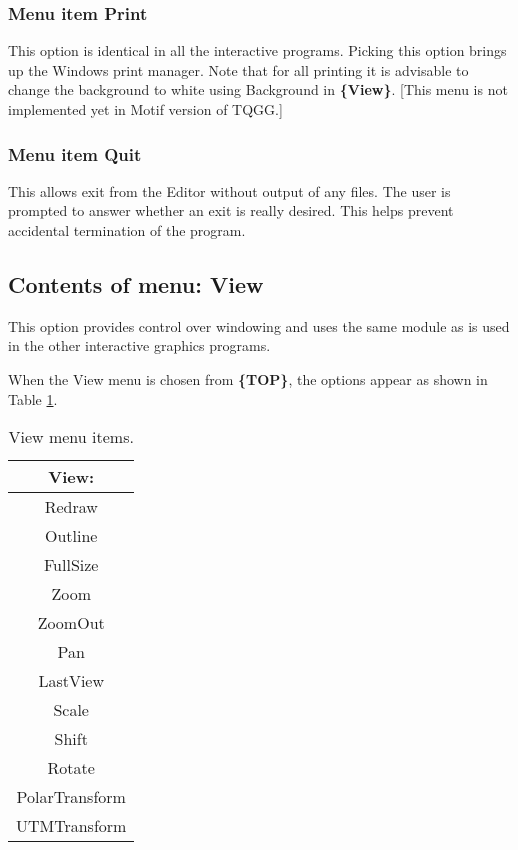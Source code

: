 \documentclass{article}
\begin{document}
\subsubsection[Menu item Print]{Menu item Print}
This option is identical in all the interactive programs. Picking this option brings up the Windows print manager. Note that for all printing it is advisable to change the background to white using Background in \textbf{\{View\}}. [This menu is not implemented yet in Motif version of TQGG.]


\subsubsection[Menu item Quit]{Menu item Quit}
This allows exit from the Editor without output of any files. The user is prompted to answer whether an exit is really desired. This helps prevent accidental termination of the program.


\subsection{Contents of menu: View}
This option provides control over windowing and uses the same module as is used in the other interactive graphics programs.

When the View menu is chosen from \textbf{\{TOP\}}, the options appear as shown in Table \ref{tab:VIEW}.

\begin{table}[htb!]
 \caption{View menu items.}
  \begin{center}
   \begin{tabular}{|c|}
    \hline
View:\\     \hline
Redraw \\ Outline \\    \hline
FullSize \\ Zoom \\ ZoomOut \\ Pan \\ LastView \\    \hline
Scale \\ Shift \\ Rotate \\    \hline
PolarTransform \\  UTMTransform \\
    \hline
   \end{tabular}
   \label{tab:VIEW}
  \end{center}
\end{table}
\end{document}
